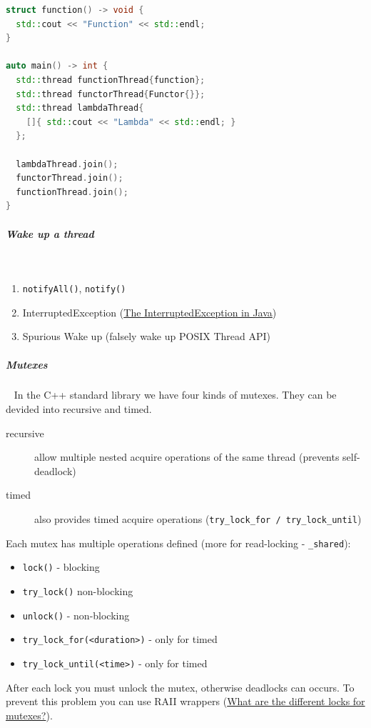 \documentclass[11pt,twoside,landscape]{article}
\begin{document}
\begin{multicols}{2}
\begin{lstlisting}[language=c++,caption={std::thread example},captionpos=b,numbers=none]
struct function() -> void {
  std::cout << "Function" << std::endl;
}

auto main() -> int {
  std::thread functionThread{function};
  std::thread functorThread{Functor{}};
  std::thread lambdaThread{
    []{ std::cout << "Lambda" << std::endl; }
  };

  lambdaThread.join();
  functorThread.join();
  functionThread.join();
}
\end{lstlisting}

\subparagraph{Wake up a thread} \
\label{sec:org94afd06}
\begin{enumerate}
\item \texttt{notifyAll()}, \texttt{notify()}
\item InterruptedException (\href{../../../roam/20220228135733-the_interruptedexception_in_java.org}{The InterruptedException in Java})
\item Spurious Wake up (falsely wake up POSIX Thread API)
\end{enumerate}

\subparagraph{Mutexes} \
\label{sec:orga311c48}
In the C++ standard library we have four kinds of mutexes.
They can be devided into recursive and timed.

\begin{description}
\item[{recursive}] allow multiple nested acquire operations of the same thread (prevents self-deadlock)
\item[{timed}] also provides timed acquire operations (\texttt{try\_lock\_for / try\_lock\_until})
\end{description}


Each mutex has multiple operations defined (more for read-locking - \texttt{\_shared}):
\begin{itemize}
\item \texttt{lock()} - blocking
\item \texttt{try\_lock()} non-blocking
\item \texttt{unlock()} - non-blocking
\item \texttt{try\_lock\_for(<duration>)} - only for timed
\item \texttt{try\_lock\_until(<time>)} - only for timed
\end{itemize}


After each lock you must unlock the mutex, otherwise deadlocks can occurs.
To prevent this problem you can use RAII wrappers (\href{../../../roam/20230629135006-what_are_the_different_locks_for_mutexes.org}{What are the different locks for mutexes?}).



\end{multicols}
\end{document}
